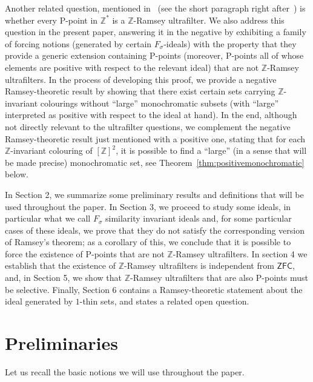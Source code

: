 \documentclass{amsart}
\theoremstyle{definition}
\theoremstyle{remark}
\numberwithin{equation}{section}
\newcommand{\ZFC}{\mathsf{ZFC}}
\begin{document}
Another related question, mentioned in~\cite[p. 458]{MR3681104} (see the short paragraph right after~\cite[Corollary 2.7]{MR3681104}) is whether every P-point in $\mathbb{Z}^{*}$ is a $\mathbb{Z}$-Ramsey ultrafilter. We also address this question in the present paper, answering it in the negative by exhibiting a family of forcing notions (generated by certain $F_\sigma$-ideals) with the property that they provide a generic extension containing P-points (moreover, P-points all of whose elements are positive with respect to the relevant ideal) that are not $\mathbb Z$-Ramsey ultrafilters. In the process of developing this proof, we provide a negative Ramsey-theoretic result by showing that there exist certain sets carrying $\mathbb Z$-invariant colourings without ``large'' monochromatic subsets (with ``large'' interpreted as positive with respect to the ideal at hand). In the end, although not directly relevant to the ultrafilter questions, we complement the negative Ramsey-theoretic result just mentioned with a positive one, stating that for each $\mathbb Z$-invariant colouring of $[\mathbb Z]^2$, it is possible to find a ``large'' (in a sense that will be made precise) monochromatic set, see Theorem~\ref{thm:positivemonochromatic} below.

In Section 2, we summarize some preliminary results and definitions that will be used throughout the paper. In Section 3, we proceed to study some ideals, in particular what we call $F_\sigma$ similarity invariant ideals and, for some particular cases of these ideals, we prove that they do not satisfy the corresponding version of Ramsey's theorem; as a corollary of this, we conclude that it is possible to force the existence of P-points that are not $\mathbb Z$-Ramsey ultrafilters. In section 4 we establish that the existence of $\mathbb Z$-Ramsey ultrafilters is independent from $\ZFC$, and, in Section 5, we show that $\mathbb Z$-Ramsey ultrafilters that are also P-points must be selective. Finally, Section 6 contains a Ramsey-theoretic statement about the ideal generated by $1$-thin sets, and states a related open question.

\section{Preliminaries}

Let us recall the basic notions we will use throughout the paper.

\medskip
\end{document}
